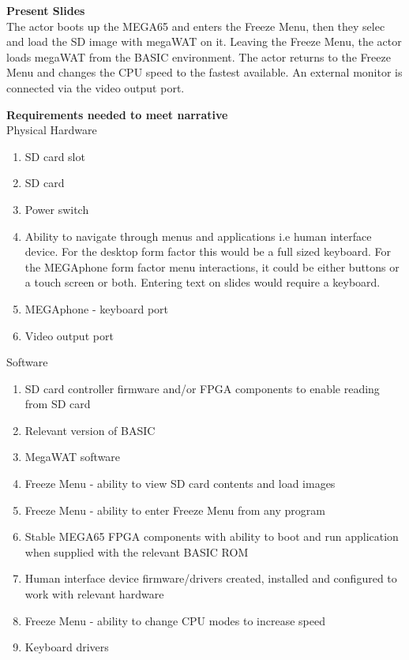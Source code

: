 \textbf{Present Slides}\\
The actor boots up the MEGA65 and enters the Freeze Menu, then they selec and load the SD image with megaWAT on it. Leaving the Freeze Menu, the actor loads megaWAT from the BASIC environment. The actor returns to the Freeze Menu and changes the CPU speed to the fastest available. An external monitor is connected via the video output port.

\textbf{Requirements needed to meet narrative}\\
Physical Hardware
\begin{enumerate}
\item SD card slot
\item SD card
\item Power switch
\item Ability to navigate through menus and applications i.e human interface device. For the desktop form factor this would be a full sized keyboard. For the MEGAphone form factor menu interactions, it could be either buttons or a touch screen or both. Entering text on slides would require a keyboard.
\item MEGAphone - keyboard port
\item Video output port
\end{enumerate}

Software\\
\begin{enumerate}
\item SD card controller firmware and/or FPGA components to enable reading from SD card
\item Relevant version of BASIC 
\item MegaWAT software
\item Freeze Menu - ability to view SD card contents and load images
\item Freeze Menu - ability to enter Freeze Menu from any program
\item Stable MEGA65 FPGA components with ability to boot and run application when supplied with the relevant BASIC ROM
\item Human interface device firmware/drivers created, installed and configured to work with relevant hardware
\item Freeze Menu - ability to change CPU modes to increase speed
\item Keyboard drivers
\end{enumerate}

